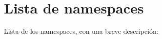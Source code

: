\section{Lista de \textquotesingle{}namespaces\textquotesingle{}}
Lista de los \textquotesingle{}namespaces\textquotesingle{}, con una breve descripción\+:\begin{DoxyCompactList}
\item{}
\end{DoxyCompactList}
